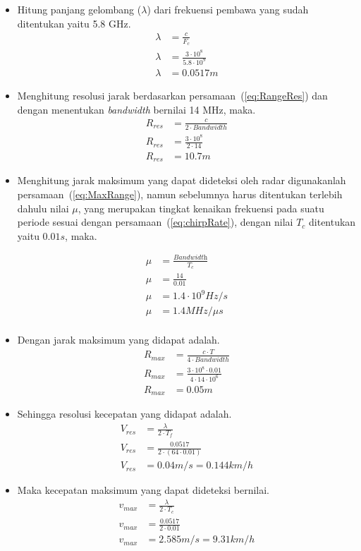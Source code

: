 \begin{itemize}
	\item Hitung panjang gelombang ($\lambda$) dari frekuensi pembawa yang sudah ditentukan yaitu 5.8 GHz.
	\begin{align*}
		\lambda &= \frac{c}{F_{c}}\\
		\lambda &= \frac{3 \cdot 10^{8}}{5.8 \cdot 10^{9}}\\
		\lambda &= 0.0517 m
	\end{align*}

	\item Menghitung resolusi jarak berdasarkan persamaan~(\ref{eq:RangeRes}) dan dengan menentukan \textit{bandwidth} bernilai 14 MHz, maka.
		\begin{align*}
			R_{res} &= \frac{c}{2 \cdot Bandwidth} \\
			R_{res} &= \frac{3 \cdot 10^{8}}{2 \cdot 14}\\
			R_{res} &= 10.7 m
		\end{align*}
	\item Menghitung jarak maksimum yang dapat dideteksi oleh radar digunakanlah persamaan~(\ref{eq:MaxRange}), namun sebelumnya harus ditentukan terlebih dahulu nilai $\mu$, yang merupakan tingkat kenaikan frekuensi pada suatu periode sesuai dengan persamaan~(\ref{eq:chirpRate}), dengan nilai $T_{c}$ ditentukan yaitu $0.01 s$, maka.
	
		\begin{align*}
		\mu &= \frac{\textit{Bandwidth}}{T_{c}}\\
		\mu &= \frac{\textit{14}}{0.01}\\
		\mu &= 1.4 \cdot 10^{9} Hz/s \\
		\mu &= 1.4 MHz/ \mu s \\
		\end{align*}

	\item 	
	Dengan jarak maksimum yang didapat adalah.
		\begin{align*}
		R_{max} &= \frac{c \cdot T}{4 \cdot Bandwidth}\\
		R_{max} &= \frac{3 \cdot 10^{8} \cdot 0.01}{4 \cdot 14 \cdot 10^{6}}\\
		R_{max} &= 0.05 m
		\end{align*}
	
	\item Sehingga resolusi kecepatan yang didapat adalah.
		\begin{align*}
			V_{res} &= \frac{\lambda}{2 \cdot T_{f}}\\
			V_{res} &= \frac{0.0517}{2 \cdot (64 \cdot 0.01)}\\
			V_{res} &= 0.04 m/s = 0.144 km/h
		\end{align*}
	\item Maka kecepatan maksimum yang dapat dideteksi bernilai.
		\begin{align*}
			v_{max} &= \frac{\lambda}{2 \cdot T_{c}}\\
			v_{max} &= \frac{0.0517}{2 \cdot 0.01}\\
			v_{max} &= 2.585 m/s = 9.31 km/h
		\end{align*}
\end{itemize}

